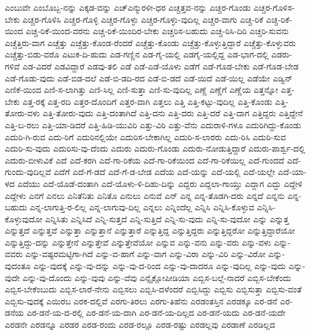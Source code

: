 {ಎಂಬುವೇ
ಎಂಬೊಬ್ಬ-ನನ್ನು
ಎಕ್ಕಡ-ವನ್ನು
ಎಚ್ಎನ್ಮುರಳೀ-ಧರ
ಎಚ್ಚತ್ತವ-ನನ್ನು
ಎಚ್ಚರ-ಗೊಂಡು
ಎಚ್ಚರ-ಗೊಳಿಸ-ಬೇಕು
ಎಚ್ಚರ-ಗೊಳಿಸಿ
ಎಚ್ಚರ-ಗೊಳ್ಳಿ
ಎಚ್ಚರ-ಗೊಳ್ಳು
ಎಚ್ಚರ-ಗೊಳ್ಳು-ವುದಿಲ್ಲ
ಎಚ್ಚರ-ವಾಗು
ಎಚ್ಚ-ರಿಕೆ
ಎಚ್ಚ-ರಿಕೆ-ಯಿಂದ
ಎಚ್ಚ-ರಿಕೆ-ಯಿಂದ-ವರನು
ಎಚ್ಚ-ರಿಕೆ-ಯಿಂದಿರ-ಬೇಕು
ಎಚ್ಚರಿಸ-ಬಹುದು
ಎಚ್ಚ-ರಿಸಿ-ದಿರಿ
ಎಚ್ಚರಿ-ಸುವನು
ಎಚ್ಚೆತ್ತಿರು-ವಾಗ
ಎಚ್ಚೆತ್ತು
ಎಚ್ಚೆತ್ತು-ಕೊಂಡ-ರೆಂದರೆ
ಎಚ್ಚೆತ್ತು-ಕೊಂಡು
ಎಚ್ಚೆತ್ತು-ಕೊಳ್ಳುತ್ತಿದ್ದಾರೆ
ಎಚ್ಚೆತ್ತು-ಕೊಳ್ಳುವರು
ಎಚ್ಚೆತ್ತು-ಬಿಡು-ವರೊ
ಎಟುಕ-ದಿ-ಹುದು
ಎಡ-ಗಣ್ಣಿನ
ಎಡ-ಗೈ-ಯಲ್ಲಿ
ಎಡಗೈ-ಯಲ್ಲಿದ್ದ
ಎಡ-ಭಾಗ-ದಲ್ಲಿ
ಎಡರು-ಗಳಿವೆ
ಎಡ-ವಿದರೆ
ಎಡವಿದ್ದಾರೆ
ಎಡವು-ತಲಿ
ಎಡೆ
ಎಡೆ-ಎಡೆ-ಯೊಳು
ಎಡೆಗೆ
ಎಡೆ-ಗೊಡ-ಬೇಕು
ಎಡೆ-ಗೊಡ-ಬೇಡ
ಎಡೆ-ಗೊಡು-ವುದು
ಎಡೆ-ಬಿಡ-ದಲೆ
ಎಡೆ-ಬಿ-ಡದಿ-ರದ
ಎಡೆ-ಬಿ-ಡದೆ
ಎಡೆ-ಯಿದೆ
ಎಡೆ-ಯಿಲ್ಲ
ಎಡೆಯೇ
ಎಡ್ವಿನ್
ಎಣಿಕೆ-ಯಿಂದ
ಎಣಿ-ಸ-ಲಾಗಿತ್ತು
ಎಣಿ-ಸಿಲ್ಲ
ಎಣಿ-ಸುತ್ತಾ
ಎಣಿ-ಸು-ವುದಿಲ್ಲ
ಎಣ್ಣೆ
ಎಣ್ಣೆಗೆ
ಎಣ್ಣೆಯ
ಎತ್ತನ್ನೋ
ಎತ್ತ-ಬೇಕು
ಎತ್ತ-ರಕ್ಕೆ
ಎತ್ತ-ರದಿ
ಎತ್ತರ-ದೊಂದಿಗೆ
ಎತ್ತರ-ವಾಗಿ
ಎತ್ತಲು
ಎತ್ತಿ
ಎತ್ತಿ-ಕಟ್ಟು-ವುದಿಲ್ಲ
ಎತ್ತಿ-ಕೊಂಡು
ಎತ್ತಿ-ತೋರು-ವಳು
ಎತ್ತಿ-ತೋರು-ವುದು
ಎತ್ತಿ-ದಂತಾಗಿದೆ
ಎತ್ತಿ-ದನು
ಎತ್ತಿ-ದರು
ಎತ್ತಿ-ದರೆ
ಎತ್ತಿ-ದಾಗ
ಎತ್ತಿದ್ದರು
ಎತ್ತಿದ್ದೇನೆ
ಎತ್ತಿ-ಬ-ರಲು
ಎತ್ತಿ-ಯಾ-ಡಿದರೆ
ಎತ್ತಿ-ಹಿಡಿ-ಯುವಿರಿ
ಎತ್ತು-ವಿರಿ
ಎತ್ತು-ವೆನು
ಎದುರಾಳಿ-ಗಳೂ
ಎದುರಿಗಿದ್ದು-ಕೊಂಡು
ಎದುರಿ-ಗಿ-ರುವ
ಎದು-ರಿಗೆ
ಎದುರಿನಲ್ಲಿಯೇ
ಎದುರಿಸ-ಬೇಕಾಗಿಲ್ಲ
ಎದುರಿ-ಸ-ಲಾರರು
ಎದು-ರಿಸಿ
ಎದುರಿ-ಸುವ
ಎದುರಿ-ಸು-ವುದು
ಎದುರಿಸು-ವು-ದೆಂದು
ಎದುರು
ಎದುರು-ಗೊಂಡು
ಎದುರು-ನೋಡುತ್ತಿದ್ದಾರೆ
ಎದುರು-ಪಾರ್ಶ್ವ-ದಲ್ಲಿ
ಎದುರು-ಬೀಳುವಿಕೆ
ಎದೆ
ಎದೆ-ಕರಗಿ
ಎದೆ-ಗಾ-ರಿಕೆಯ
ಎದೆ-ಗಾ-ರಿಕೆಯಿಂದ
ಎದೆ-ಗಾ-ರಿಕೆಯಿಲ್ಲ
ಎದೆ-ಗುಂದದೆ
ಎದೆ-ಗುಂದು-ವುದಿಲ್ಲವೆ
ಎದೆಗೆ
ಎದೆ-ಗೆ-ಡದೆ
ಎದೆ-ಗೆ-ಡ-ಬೇಡ
ಎದೆಯ
ಎದೆ-ಯನ್ನು
ಎದೆ-ಯಲ್ಲಿ
ಎದೆ-ಯಲ್ಲೇ
ಎದೆ-ಯಾ-ಳದ
ಎದೆಯು
ಎದೆ-ಯೊಡೆ-ದಂತಾಗಿ
ಎದೆ-ಯೊಳು-ಳಿ-ದಿಹು-ದಿನ್ನು
ಎದ್ದರು
ಎದ್ದಲಾ-ಗಾಯ್ತು
ಎದ್ದಾಗ
ಎದ್ದು
ಎದ್ದೇಳಿ
ಎದ್ದೇಳು
ಎನಗೆ
ಎನಲು
ಎನಿತೆನಿತು
ಎನಿತೊ
ಎನುಲು
ಎನುವೆ
ಎನ್
ಎನ್ನ
ಎನ್ನ-ತೊಡಗಿ-ದರು
ಎನ್ನದೆ
ಎನ್ನನು
ಎನ್ನ-ಬಹುದು
ಎನ್ನ-ಲಾಗುತ್ತಿ-ರ-ಲಿಲ್ಲ
ಎನ್ನ-ಲಾಗುವು-ದಿಲ್ಲ
ಎನ್ನಲು
ಎನ್ನಿಂದೆಲ್ಲ
ಎನ್ನಿಸಿ
ಎನ್ನಿಸಿ-ಕೊಳ್ಳುವ
ಎನ್ನಿಸಿ-ಕೊಳ್ಳುವುದೋ
ಎನ್ನಿಸಿತು
ಎನ್ನಿಸಿದೆ
ಎನ್ನಿ-ಸುತ್ತದೆ
ಎನ್ನಿ-ಸುತ್ತಿದೆ
ಎನ್ನಿ-ಸು-ವುದು
ಎನ್ನಿ-ಸು-ವುದೋ
ಎನ್ನು
ಎನ್ನುತ್ತ
ಎನ್ನುತ್ತದೆ
ಎನ್ನುತ್ತವೆ
ಎನ್ನುತ್ತಾ
ಎನ್ನುತ್ತಾನೆ
ಎನ್ನುತ್ತಾರೆ
ಎನ್ನುತ್ತಿದ್ದ
ಎನ್ನುತ್ತಿದ್ದರು
ಎನ್ನುತ್ತಿದ್ದರೋ
ಎನ್ನುತ್ತಿದ್ದಾರೆಯೋ
ಎನ್ನುತ್ತಿದ್ದು-ದನ್ನು
ಎನ್ನುತ್ತೇನೆ
ಎನ್ನುತ್ತೇವೆ
ಎನ್ನುತ್ತೇವೆಯೋ
ಎನ್ನುವ
ಎನ್ನು-ವನು
ಎನ್ನು-ವರು
ಎನ್ನು-ವಳು
ಎನ್ನು-ವವರು
ಎನ್ನು-ವಷ್ಟರಮಟ್ಟಿಗಾ-ಗಿದೆ
ಎನ್ನು-ವ-ಹಾಗೆ
ಎನ್ನು-ವಾಗ
ಎನ್ನು-ವಿರಾ
ಎನ್ನು-ವಿರಿ
ಎನ್ನು-ವಿರೋ
ಎನ್ನು-ವುದಂತೂ
ಎನ್ನು-ವುದಕ್ಕೆ
ಎನ್ನು-ವು-ದನ್ನು
ಎನ್ನು-ವು-ದ-ರಿಂದ
ಎನ್ನು-ವು-ದಾದರೂ
ಎನ್ನು-ವುದಿಲ್ಲ
ಎನ್ನು-ವುದು
ಎನ್ನು-ವುದೇ
ಎನ್ನು-ವು-ದೊಂದು
ಎನ್ನು-ವುವು
ಎನ್ನು-ವೆವು
ಎನ್ಸೈಕ್ಲೋಪೀಡಿಯಾ
ಎಬ್ಬಿಸ-ಬಲ್ಲೆ-ನಾದರೆ
ಎಬ್ಬಿಸ-ಬೇಕೆಂದು
ಎಬ್ಬಿಸ-ಬೇಕೆಂಬುದು
ಎಬ್ಬಿಸ-ಲಾರೆ-ನೇನು
ಎಬ್ಬಿಸಲು
ಎಬ್ಬಿಸಿ-ದಳೆಂದರೆ
ಎಬ್ಬಿಸಿದ್ದು
ಎಬ್ಬಿಸು
ಎಬ್ಬಿಸುತ್ತಾ
ಎಬ್ಬಿಸು-ವಂತೆ
ಎಬ್ಬಿಸು-ವುದಕ್ಕೆ
ಎಯಿರಬ
ಎರಕ-ದಲ್ಲಿವೆ
ಎರಗು-ತಿರಲು
ಎರಗು-ತಿಹೆನು
ಎರಡಂತಸ್ತಿನ
ಎರಡಕ್ಕೂ
ಎರ-ಡನೆ
ಎರ-ಡನೆಯ
ಎರ-ಡನೆ-ಯ-ದ-ರಲ್ಲಿ
ಎರ-ಡನೆ-ಯ-ದಾಗಿ
ಎರ-ಡನೆ-ಯ-ದಿಲ್ಲದ
ಎರ-ಡನೆ-ಯದು
ಎರ-ಡನೆ-ಯದೇ
ಎರಡನೇ
ಎರಡನ್ನೂ
ಎರಡರ
ಎರಡ-ರಂದು
ಎರಡ-ರಲ್ಲೂ
ಎರಡ-ರಷ್ಟು
ಎರಡಲ್ಲವು
ಎರಡಾಣೆ
ಎರಡಿಲ್ಲದ
}
